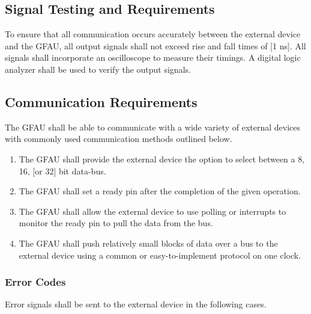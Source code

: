 \documentclass[12pt]{extarticle}
\begin{document}
        \subsection{Signal Testing and Requirements} To ensure that all
        communication occurs accurately between the external device and the
        GFAU, all output signals shall not exceed rise and fall times of [1
        ns]. All signals shall incorporate an oscilloscope to measure their
        timings. A digital logic analyzer shall be used to verify the output
        signals.

        \subsection{Communication Requirements} The GFAU shall be able to
        communicate with a wide variety of external devices with commonly used
        communication methods outlined below.

        \begin{enumerate}

            \item The GFAU shall provide the external device the option to
            select between a 8, 16, [or 32] bit data-bus.

            \item The GFAU shall set a ready pin after the completion of the
            given operation.

            \item The GFAU shall allow the external device to use polling or
            interrupts to monitor the ready pin to pull the data from the bus.

            \item The GFAU shall push relatively small blocks of data over a
            bus to the external device using a common or easy-to-implement
            protocol on one clock.

        \end{enumerate}

            \subsubsection{Error Codes} Error signals shall be sent to the
            external device in the following cases.
\end{document}
